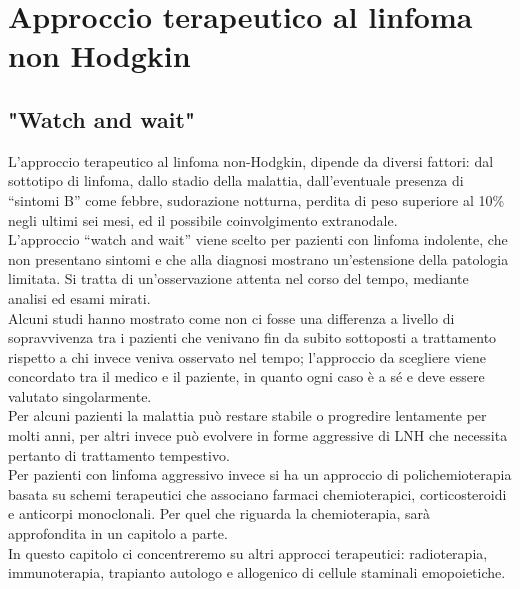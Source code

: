\chapter{Approccio terapeutico al linfoma non Hodgkin}

\section{"Watch and wait"}
L’approccio terapeutico al linfoma non-Hodgkin, dipende da diversi fattori: dal sottotipo di linfoma, 
dallo stadio della malattia, dall’eventuale presenza di “sintomi B” come febbre, sudorazione notturna, 
perdita di peso superiore al 10\% negli ultimi sei mesi, ed il possibile coinvolgimento extranodale\cite{LLS}.\\
L’approccio “watch and wait” viene scelto per pazienti con linfoma indolente, che non presentano sintomi e che 
alla diagnosi mostrano un’estensione della patologia limitata. 
Si tratta di un’osservazione attenta nel corso del tempo, mediante analisi ed esami mirati.\\
Alcuni studi hanno mostrato come non ci fosse una differenza a livello di sopravvivenza tra i pazienti che venivano 
fin da subito sottoposti a trattamento rispetto a chi invece veniva osservato nel tempo; l’approccio da scegliere 
viene concordato tra il medico e il paziente, in quanto ogni caso è a sé e deve essere valutato singolarmente\cite{LLS}.\\
Per alcuni pazienti la malattia può restare stabile o progredire lentamente per molti anni, 
per altri invece può evolvere in forme aggressive di LNH che necessita pertanto di trattamento tempestivo.\\
Per pazienti con linfoma aggressivo invece si ha un approccio di polichemioterapia basata su schemi terapeutici 
che associano farmaci chemioterapici, corticosteroidi e anticorpi monoclonali. 
Per quel che riguarda la chemioterapia, sarà approfondita in un capitolo a parte.\\ 
In questo capitolo ci concentreremo su altri approcci terapeutici: 
radioterapia, immunoterapia, trapianto autologo e allogenico di cellule staminali emopoietiche.\\

